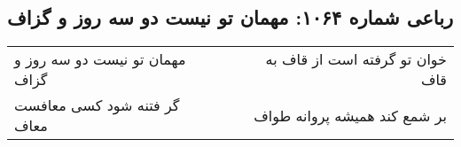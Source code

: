 \begin{center}
\section*{رباعی شماره ۱۰۶۴: مهمان تو نیست دو سه روز و گزاف}
\label{sec:1064}
\begin{longtable}{l p{0.5cm} r}
مهمان تو نیست دو سه روز و گزاف
&&
خوان تو گرفته است از قاف به قاف
\\
گر فتنه شود کسی معافست معاف
&&
بر شمع کند همیشه پروانه طواف
\\
\end{longtable}
\end{center}
